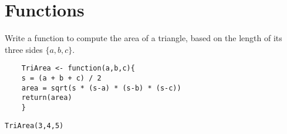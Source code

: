 


\section{Functions}

Write a function to compute the area of a triangle, based on the length of its three sides $\{a,b,c\}$.

\begin{framed}
	\begin{verbatim}
	TriArea <- function(a,b,c){
	s = (a + b + c) / 2 
	area = sqrt(s * (s-a) * (s-b) * (s-c))
	return(area)
	}
	\end{verbatim}
\end{framed}

\begin{verbatim}
TriArea(3,4,5)
\end{verbatim}


